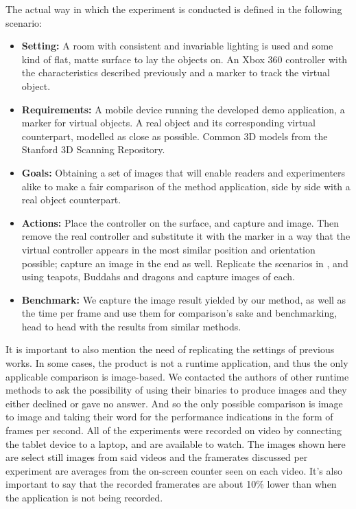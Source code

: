 The actual way in which the experiment is conducted is defined in the following scenario:
\begin{itemize}
    \item \textbf{Setting:} A room with consistent and invariable lighting is used and some kind of flat, matte surface to lay the objects on. An Xbox 360 controller with the characteristics described previously and a marker to track the virtual object.
    \item \textbf{Requirements:} A mobile device running the developed demo application, a marker for virtual objects. A real object and its corresponding virtual counterpart, modelled as close as possible. Common 3D models from the Stanford 3D Scanning Repository.
    \item \textbf{Goals:} Obtaining a set of images that will enable readers and experimenters alike to make a fair comparison of the method application, side by side with a real object counterpart.
    \item \textbf{Actions:} Place the controller on the surface, and capture and image. Then remove the real controller and substitute it with the marker in a way that the virtual controller appears in the most similar position and orientation possible; capture an image in the end as well. Replicate the scenarios in \citet{kanbara2004}, \citet{karsh2014} and \citet{pessoa2011} using teapots, Buddahs and dragons and capture images of each.
     \item \textbf{Benchmark:} We capture the image result yielded by our method, as well as the time per frame and use them for comparison's sake and benchmarking, head to head with the results from similar methods.
\end{itemize}

It is important to also mention the need of replicating the settings of previous works. In some cases, the product is not a runtime application, and thus the only applicable comparison is image-based. We contacted the authors of other runtime methods to ask the possibility of using their binaries to produce images and they either declined or gave no answer. And so the only possible comparison is image to image and taking their word for the performance indications in the form of frames per second.\newline
All of the experiments were recorded on video by connecting the tablet device to a laptop, and are available to watch. The images shown here are select still images from said videos and the framerates discussed per experiment are averages from the on-screen counter seen on each video. It's also important to say that the recorded framerates are about 10\% lower than when the application is not being recorded.\newline

